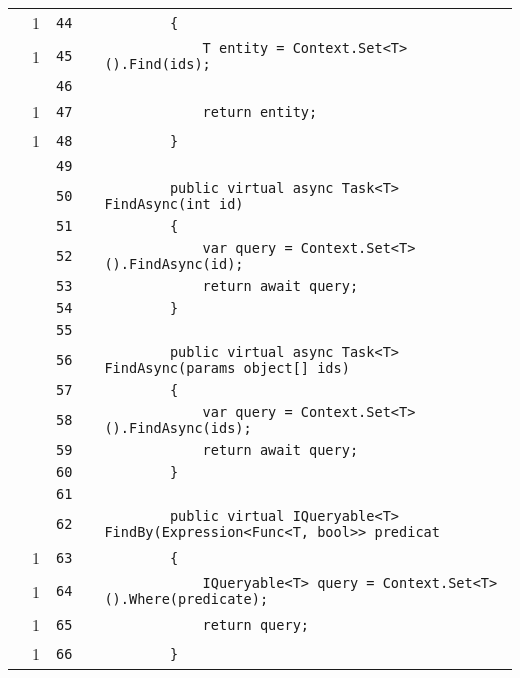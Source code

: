 \documentclass[a4paper,10pt]{article}
\begin{document}
\begin{longtable}[l]{lrrll}
\cellcolor{green} & 1 & \verb~44~ & & \verb~        {~\\
\cellcolor{green} & 1 & \verb~45~ & & \verb~            T entity = Context.Set<T>().Find(ids);~\\
\cellcolor{gray} &  & \verb~46~ & & \verb~~\\
\cellcolor{green} & 1 & \verb~47~ & & \verb~            return entity;~\\
\cellcolor{green} & 1 & \verb~48~ & & \verb~        }~\\
\cellcolor{gray} &  & \verb~49~ & & \verb~~\\
\cellcolor{gray} &  & \verb~50~ & & \verb~        public virtual async Task<T> FindAsync(int id)~\\
\cellcolor{gray} &  & \verb~51~ & & \verb~        {~\\
\cellcolor{gray} &  & \verb~52~ & & \verb~            var query = Context.Set<T>().FindAsync(id);~\\
\cellcolor{gray} &  & \verb~53~ & & \verb~            return await query;~\\
\cellcolor{gray} &  & \verb~54~ & & \verb~        }~\\
\cellcolor{gray} &  & \verb~55~ & & \verb~~\\
\cellcolor{gray} &  & \verb~56~ & & \verb~        public virtual async Task<T> FindAsync(params object[] ids)~\\
\cellcolor{gray} &  & \verb~57~ & & \verb~        {~\\
\cellcolor{gray} &  & \verb~58~ & & \verb~            var query = Context.Set<T>().FindAsync(ids);~\\
\cellcolor{gray} &  & \verb~59~ & & \verb~            return await query;~\\
\cellcolor{gray} &  & \verb~60~ & & \verb~        }~\\
\cellcolor{gray} &  & \verb~61~ & & \verb~~\\
\cellcolor{gray} &  & \verb~62~ & & \verb~        public virtual IQueryable<T> FindBy(Expression<Func<T, bool>> predicat~\\
\cellcolor{green} & 1 & \verb~63~ & & \verb~        {~\\
\cellcolor{green} & 1 & \verb~64~ & & \verb~            IQueryable<T> query = Context.Set<T>().Where(predicate);~\\
\cellcolor{green} & 1 & \verb~65~ & & \verb~            return query;~\\
\cellcolor{green} & 1 & \verb~66~ & & \verb~        }~\\

\end{longtable}
\end{document}
